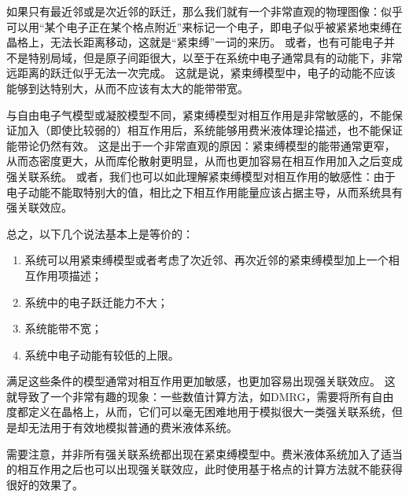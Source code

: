 如果只有最近邻或是次近邻的跃迁，那么我们就有一个非常直观的物理图像：似乎可以用“某个电子正在某个格点附近”来标记一个电子，即电子似乎被紧紧地束缚在晶格上，无法长距离移动，这就是“紧束缚”一词的来历。
或者，也有可能电子并不是特别局域，但是原子间距很大，以至于在系统中电子通常具有的动能下，非常远距离的跃迁似乎无法一次完成。
这就是说，紧束缚模型中，电子的动能不应该能够到达特别大，从而不应该有太大的能带带宽。

与自由电子气模型或凝胶模型不同，紧束缚模型对相互作用是非常敏感的，不能保证加入（即使比较弱的）相互作用后，系统能够用费米液体理论描述，也不能保证能带论仍然有效。
这是出于一个非常直观的原因：紧束缚模型的能带通常更窄，从而态密度更大，从而库伦散射更明显，从而也更加容易在相互作用加入之后变成强关联系统。
或者，我们也可以如此理解紧束缚模型对相互作用的敏感性：由于电子动能不能取特别大的值，相比之下相互作用能量应该占据主导，从而系统具有强关联效应。

总之，以下几个说法基本上是等价的：
\begin{enumerate}
    \item 系统可以用紧束缚模型或者考虑了次近邻、再次近邻的紧束缚模型加上一个相互作用项描述；
    \item 系统中的电子跃迁能力不大；
    \item 系统能带不宽；
    \item 系统中电子动能有较低的上限。
\end{enumerate}
满足这些条件的模型通常对相互作用更加敏感，也更加容易出现强关联效应。
这就导致了一个非常有趣的现象：一些数值计算方法，如DMRG，需要将所有自由度都定义在晶格上，从而，它们可以毫无困难地用于模拟很大一类强关联系统，但是却无法用于有效地模拟普通的费米液体系统。

需要注意，并非所有强关联系统都出现在紧束缚模型中。费米液体系统加入了适当的相互作用之后也可以出现强关联效应，此时使用基于格点的计算方法就不能获得很好的效果了。

